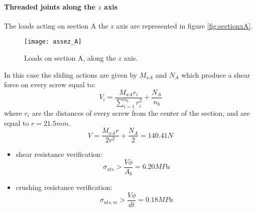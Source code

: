 \paragraph{Threaded joints along the $z$ axis}  The loads acting on section A the $z$ axis are represented in figure \ref{fig:sectionxA}.\\
\begin{figure}[h!]
    \centering
	\texttt{[image: assez\_A]}
    \caption{Loads on section A, along the $z$ axis.}
    \label{fig:sectionzA}
\end{figure}
In this case the sliding actions are given by $M_{xA}$ and $N_A$ which produce a shear force on every screw equal to:
\begin{equation*}
    V_{i} = \frac{M_{xA}r_{i}}{\sum\limits_{i=1}^{n_{{b}}} r^2_{i}} + \frac{N_{A}}{n_{b}}
\end{equation*}
where $r_{i}$ are the distances of every screw from the center of the section, and are equal to $r = 21.5 mm$.
\begin{equation*}
    V = \frac{M_{xA}r}{2r^2} +  \frac{N_{A}}{2} = 140.41 N
\end{equation*}
\begin{itemize}
    \item shear resistance verification:
    \begin{equation*}
       \sigma_{uts} > \frac{V\phi}{A_{b}} = 6.20 MPa
    \end{equation*}
    \item crushing resistance verification:
     \begin{equation*}
       \sigma_{uts,m} > \frac{V\phi}{dt} = 0.18 MPa
    \end{equation*}
\end{itemize}

